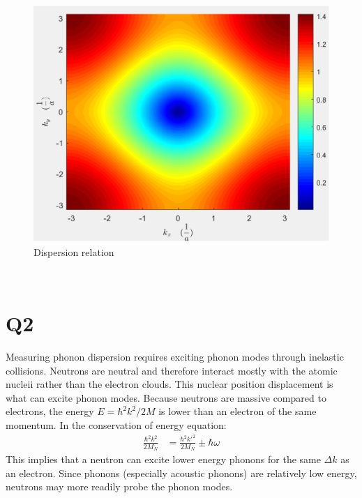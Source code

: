 \documentclass[a4paper,11pt]{article}
\numberwithin{equation}{section}
\begin{document}
\begin{figure}[h]
 \caption{Dispersion relation}
 \centering
   \includegraphics[width=\textwidth]{p1}
\end{figure}
\\
\section*{Q2}
Measuring phonon dispersion requires exciting phonon modes through inelastic collisions.
Neutrons are neutral and therefore interact mostly with the atomic nucleii rather than the electron clouds.
This nuclear position displacement is what can excite phonon modes.
Because neutrons are massive compared to electrons, the energy $E=\hbar^2k^2/2M$ is lower than an electron of the same momentum.
In the conservation of energy equation:
\begin{align}
 \frac{\hbar^2k^2}{2M_N} &= \frac{\hbar^2k'^2}{2M_N}\pm\hbar\omega
\end{align}
This implies that a neutron can excite lower energy phonons for the same $\Delta k$ as an electron.
Since phonons (especially acoustic phonons) are relatively low energy, neutrons may more readily probe the phonon modes.
\end{document}
